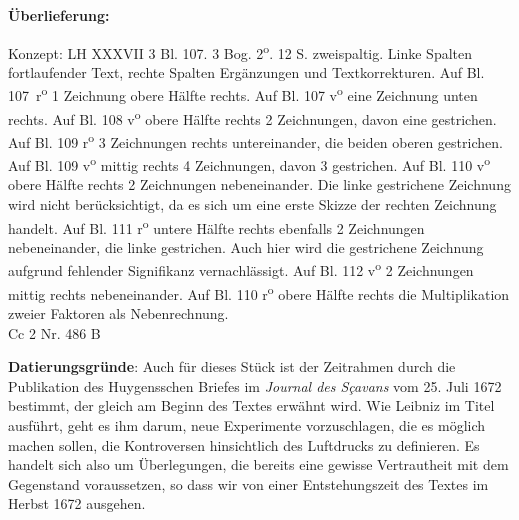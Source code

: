         \begin{ledgroupsized}[r]{120mm}
                \footnotesize 
                \pstart                
                \noindent\textbf{\"{U}berlieferung:}   
                \pend
                \end{ledgroupsized}
                            \begin{ledgroupsized}[r]{114mm}
                            \footnotesize 
                            \pstart \parindent -6mm
                            Konzept: LH XXXVII 3 Bl. 107. 3 Bog. 2\textsuperscript{o}. 12 S. zweispaltig. Linke Spalten fortlaufender Text, rechte Spalten Erg\"{a}nzungen und Textkorrekturen. Auf Bl. 107~r\textsuperscript{o} 1 Zeichnung obere H\"{a}lfte rechts. Auf Bl. 107 v\textsuperscript{o} eine Zeichnung unten rechts. Auf Bl. 108 v\textsuperscript{o} obere H\"{a}lfte rechts 2 Zeichnungen, davon eine gestrichen. Auf Bl. 109 r\textsuperscript{o} 3 Zeichnungen rechts untereinander, die beiden oberen gestrichen. Auf Bl. 109 v\textsuperscript{o} mittig rechts 4 Zeichnungen, davon 3 gestrichen. Auf Bl. 110 v\textsuperscript{o} obere H\"{a}lfte rechts 2 Zeichnungen nebeneinander. Die linke gestrichene Zeichnung wird nicht berücksichtigt, da es sich um eine erste Skizze der rechten Zeichnung handelt. Auf Bl. 111 r\textsuperscript{o} untere H\"{a}lfte rechts ebenfalls 2 Zeichnungen nebeneinander, die linke gestrichen. Auch hier wird die gestrichene Zeichnung aufgrund fehlender Signifikanz vernachlässigt. Auf Bl. 112 v\textsuperscript{o} 2 Zeichnungen mittig rechts nebeneinander. Auf Bl. 110 r\textsuperscript{o} obere H\"{a}lfte rechts die Multiplikation zweier Faktoren als Nebenrechnung. 
 \\Cc 2 Nr. 486 B \pend
                            \end{ledgroupsized}
                \vspace*{5mm}
                \begin{ledgroup}
                \footnotesize 
                \pstart
            \noindent\footnotesize{\textbf{Datierungsgr\"{u}nde}: Auch f\"{u}r dieses St\"{u}ck ist der Zeitrahmen durch die Publikation des Huygensschen Briefes im \cite{00062}\textit{Journal des S\c{c}avans} vom 25. Juli 1672 bestimmt, der gleich am Beginn des Textes erw\"{a}hnt wird. Wie Leibniz im Titel ausf\"{u}hrt, geht es ihm darum, neue Experimente vorzuschlagen, die es m\"{o}glich machen sollen, die Kontroversen hinsichtlich des Luftdrucks zu definieren. Es handelt sich also um \"{U}berlegungen, die bereits eine gewisse Vertrautheit mit dem Gegenstand voraussetzen, so dass wir von einer Entstehungszeit des Textes im Herbst 1672 ausgehen.}
                \pend
                \end{ledgroup}
